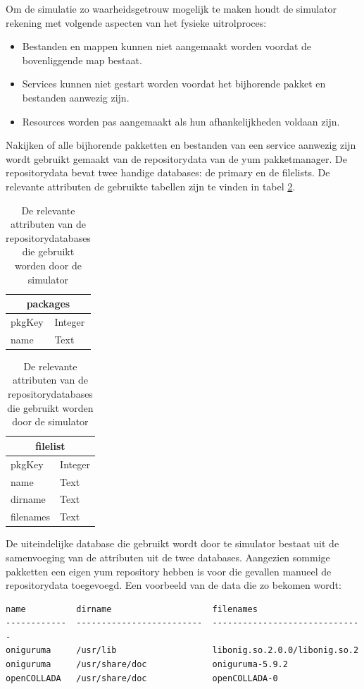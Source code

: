 Om de simulatie zo waarheidsgetrouw mogelijk te maken houdt de simulator rekening met volgende aspecten van het fysieke uitrolproces:

\begin{itemize}
  \item Bestanden en mappen kunnen niet aangemaakt worden voordat de bovenliggende map bestaat.
  \item Services kunnen niet gestart worden voordat het bijhorende pakket en bestanden aanwezig zijn.
  \item Resources worden pas aangemaakt als hun afhankelijkheden voldaan zijn.
\end{itemize}

Nakijken of alle bijhorende pakketten en bestanden van een service aanwezig zijn wordt gebruikt gemaakt van de repositorydata van de yum pakketmanager.
De repositorydata bevat twee handige databases: de primary en de filelists.
De relevante attributen de gebruikte tabellen zijn te vinden in tabel \ref{table:repodata}.

\begin{table}[h]
\centering
\begin{tabular}[t]{ |l|l| }
  \hline
  \multicolumn{2}{|c|}{packages} \\
  \hline
  pkgKey & Integer \\
  name & Text \\
  \hline
\end{tabular}
\quad
\begin{tabular}[t]{ |l|l| }
  \hline
  \multicolumn{2}{|c|}{filelist} \\
  \hline
  pkgKey & Integer \\
  name & Text \\
  dirname & Text \\
  filenames & Text \\
  \hline
\end{tabular}
\caption{De relevante attributen van de repositorydatabases die gebruikt worden door de simulator}
\label{table:repodata}
\end{table}

De uiteindelijke database die gebruikt wordt door te simulator bestaat uit de samenvoeging van de attributen uit de twee databases.
Aangezien sommige pakketten een eigen yum repository hebben is voor die gevallen manueel de repositorydata toegevoegd.
Een voorbeeld van de data die zo bekomen wordt:

\begin{verbatim}
name          dirname                    filenames                     
------------  -------------------------  ------------------------------
oniguruma     /usr/lib                   libonig.so.2.0.0/libonig.so.2 
oniguruma     /usr/share/doc             oniguruma-5.9.2               
openCOLLADA   /usr/share/doc             openCOLLADA-0                 
\end{verbatim}

